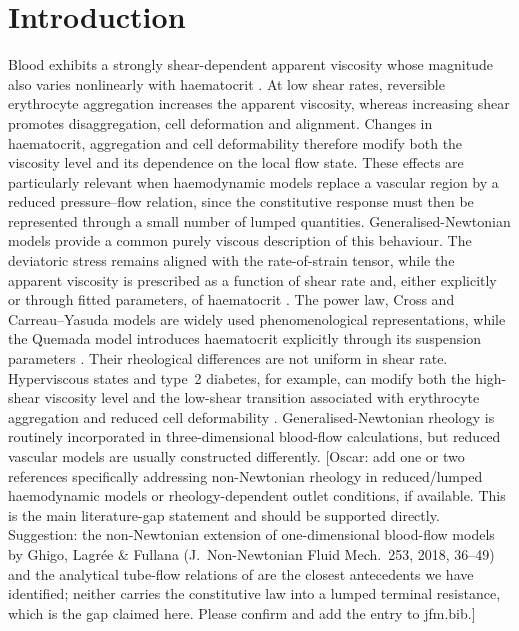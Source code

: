 \documentclass[lineno]{jfm}
\begin{document}
\section{Introduction}
\label{sec:introduction}
Blood exhibits a strongly shear-dependent apparent viscosity whose magnitude
also varies nonlinearly with haematocrit
\citep{Chien1987,Mozos2015,Nader2019}. At low shear rates, reversible
erythrocyte aggregation increases the apparent viscosity, whereas increasing
shear promotes disaggregation, cell deformation and alignment. Changes in
haematocrit, aggregation and cell deformability therefore modify both the
viscosity level and its dependence on the local flow state. These effects are
particularly relevant when haemodynamic models replace a vascular region by a
reduced pressure--flow relation, since the constitutive response must then be
represented through a small number of lumped quantities.
Generalised-Newtonian models provide a common purely viscous description of
this behaviour. The deviatoric stress remains aligned with the rate-of-strain
tensor, while the apparent viscosity is prescribed as a function of shear rate
and, either explicitly or through fitted parameters, of haematocrit
\citep{FORMAGGIA-SPRINGER,Sequeria2018,Quemada1977,Popel2005}. The power law,
Cross and Carreau--Yasuda models are widely used phenomenological
representations, while the Quemada model introduces haematocrit explicitly
through its suspension parameters
\citep{Quemada1977,Popel2005,Neofytou2004,Mimouni2016}. Their rheological
differences are not uniform in shear rate. Hyperviscous states and type~2
diabetes, for example, can modify both the high-shear viscosity level and the
low-shear transition associated with erythrocyte aggregation and reduced cell
deformability
\citep{Chien1987,Isbister1994,cho2008hemorheological,Sun2022}.
Generalised-Newtonian rheology is routinely incorporated in three-dimensional
blood-flow calculations, but reduced vascular models are usually constructed
differently.
{\color{red}[Oscar: add one or two references specifically addressing
non-Newtonian rheology in reduced/lumped haemodynamic models or
rheology-dependent outlet conditions, if available. This is the main
literature-gap statement and should be supported directly.
{\color{blue}Suggestion: the non-Newtonian extension of one-dimensional
blood-flow models by Ghigo, Lagr\'ee \& Fullana (J.\ Non-Newtonian Fluid
Mech.\ 253, 2018, 36--49) and the analytical tube-flow relations of
\citet{Sochi2015} are the closest antecedents we have identified; neither
carries the constitutive law into a lumped terminal resistance, which is the
gap claimed here. Please confirm and add the entry to jfm.bib.}]}
\end{document}
